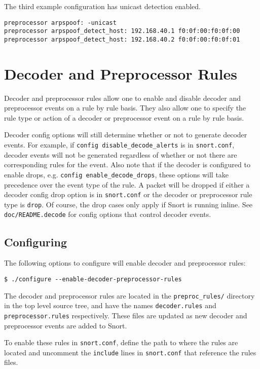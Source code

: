 \documentclass[english]{report}
\begin{document}
The third example configuration has unicast detection enabled.
\begin{verbatim}
preprocessor arpspoof: -unicast
preprocessor arpspoof_detect_host: 192.168.40.1 f0:0f:00:f0:0f:00
preprocessor arpspoof_detect_host: 192.168.40.2 f0:0f:00:f0:0f:01
\end{verbatim}

\section{Decoder and Preprocessor Rules}

Decoder and preprocessor rules allow one to enable and disable decoder
and preprocessor events on a rule by rule basis.  They also allow one
to specify the rule type or action of a decoder or preprocessor event
on a rule by rule basis.

Decoder config options will still determine whether or not to generate
decoder events.  For example, if \texttt{config disable\_decode\_alerts} is in 
\texttt{snort.conf}, decoder events will not be generated regardless of whether
or not there are corresponding rules for the event.  Also note that if
the decoder is configured to enable drops, e.g. \texttt{config enable\_decode\_drops},
these options will take precedence
over the event type of the rule.  A packet will be dropped if either a 
decoder config drop option is in \texttt{snort.conf} or the decoder or
preprocessor rule type is \texttt{drop}.  Of course, the drop cases only
apply if Snort is running inline.  See \texttt{doc/README.decode} for config
options that control decoder events.


\subsection{Configuring}
The following options to configure will enable decoder and preprocessor
rules:

\begin{verbatim}
$ ./configure --enable-decoder-preprocessor-rules
\end{verbatim}

The decoder and preprocessor rules are located in the \texttt{preproc\_rules/}
directory in the top level source tree, and have the names 
\texttt{decoder.rules} and \texttt{preprocessor.rules} respectively.  These files
are updated as new decoder and preprocessor events are added to Snort.

To enable these rules in \texttt{snort.conf}, define the path to where the rules
are located and uncomment the \texttt{include} lines in \texttt{snort.conf} that
reference the rules files.
\end{document}
